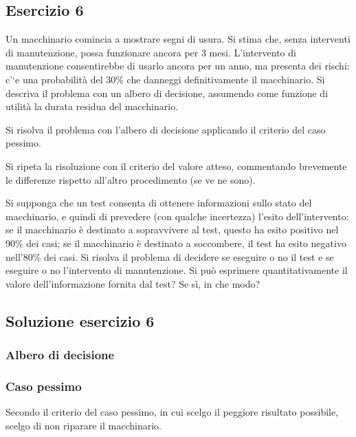 \documentclass[\main/main.tex]{subfiles}
\begin{document}
\subsection{Esercizio 6}
Un macchinario comincia a mostrare segni di usura. Si stima che, senza interventi di manutenzione, possa funzionare ancora per 3 mesi. L'intervento di manutenzione consentirebbe di usarlo ancora per un anno, ma presenta dei rischi: c'`e una probabilità del 30\% che danneggi definitivamente il macchinario. Si descriva il problema con un albero di decisione, assumendo come funzione di utilità la durata residua del macchinario.

Si risolva il problema con l'albero di decisione applicando il criterio del caso pessimo.

Si ripeta la risoluzione con il criterio del valore atteso, commentando brevemente le differenze rispetto all'altro procedimento (se ve ne sono).

Si supponga che un test consenta di ottenere informazioni sullo stato del macchinario, e quindi di prevedere (con qualche incertezza) l'esito dell'intervento: se il macchinario è destinato a sopravvivere al test, questo ha esito positivo nel 90\% dei casi; se il macchinario è destinato a soccombere, il test ha esito negativo nell'80\% dei casi. Si risolva il problema di decidere se eseguire o no il test e se eseguire o no l'intervento di manutenzione.
Si può esprimere quantitativamente il valore dell'informazione fornita dal test? Se sì, in che modo?

\subsection{Soluzione esercizio 6}
\subsubsection*{Albero di decisione}
\begin{figure}
\end{figure}

\subsubsection*{Caso pessimo}
\begin{figure}
\end{figure}
Secondo il criterio del caso pessimo, in cui scelgo il peggiore risultato possibile, scelgo di non riparare il macchinario.
\end{document}
